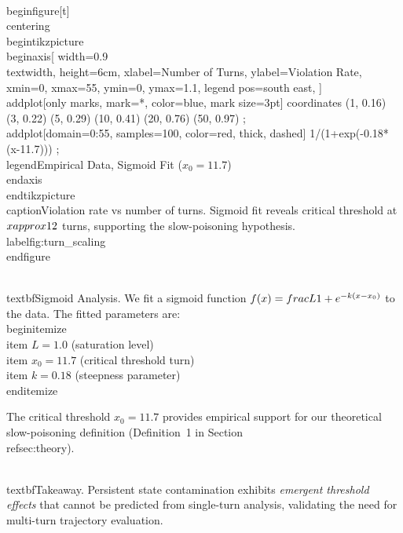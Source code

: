 \\begin{figure}[t]
\\centering
\\begin{tikzpicture}
\\begin{axis}[
    width=0.9\\textwidth,
    height=6cm,
    xlabel={Number of Turns},
    ylabel={Violation Rate},
    xmin=0, xmax=55,
    ymin=0, ymax=1.1,
    legend pos=south east,
]
\\addplot[only marks, mark=*, color=blue, mark size=3pt] coordinates {
    (1, 0.16) (3, 0.22) (5, 0.29) (10, 0.41) (20, 0.76) (50, 0.97)
};
\\addplot[domain=0:55, samples=100, color=red, thick, dashed] {
    1/(1+exp(-0.18*(x-11.7)))
};
\\legend{Empirical Data, Sigmoid Fit ($x_{0}=11.7$)}
\\end{axis}
\\end{tikzpicture}
\\caption{Violation rate vs number of turns. Sigmoid fit reveals critical threshold at $x \\approx 12$ turns, supporting the slow-poisoning hypothesis.}
\\label{fig:turn_scaling}
\\end{figure}

\\textbf{Sigmoid Analysis.} We fit a sigmoid function $f(x) = \\frac{L}{1 + e^{-k(x - x_0)}}$ to the data. The fitted parameters are:
\\begin{itemize}
    \\item $L = 1.0$ (saturation level)
    \\item $x_0 = 11.7$ (critical threshold turn)
    \\item $k = 0.18$ (steepness parameter)
\\end{itemize}

The critical threshold $x_0 = 11.7$ provides empirical support for our theoretical slow-poisoning definition (Definition~1 in Section~\\ref{sec:theory}).

\\textbf{Takeaway.} Persistent state contamination exhibits \textit{emergent threshold effects} that cannot be predicted from single-turn analysis, validating the need for multi-turn trajectory evaluation.


